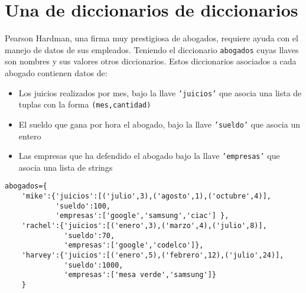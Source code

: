 \section{Una de diccionarios de diccionarios}

Pearson Hardman, una firma muy prestigiosa de abogados, requiere ayuda con el manejo de datos de sus empleados. Teniendo el diccionario \texttt{abogados} cuyas llaves son nombres y sus valores otros diccionarios. Estos diccionarios asociados a cada abogado contienen datos de:
\begin{itemize}
    \item Los juicios realizados por mes, bajo la llave \texttt{'juicios'} que asocia una lista de tuplas con la forma \texttt{(mes,cantidad)}
    \item El sueldo que gana por hora el abogado, bajo la llave \texttt{'sueldo'} que asocia un entero
    \item Las empresas que ha defendido el abogado bajo la llave \texttt{'empresas'} que asocia una lista de strings
\end{itemize}

\begin{lstlisting}[style=consola]
abogados={
    'mike':{'juicios':[('julio',3),('agosto',1),('octubre',4)],
            'sueldo':100,
            'empresas':['google','samsung','ciac'] },
    'rachel':{'juicios':[('enero',3),('marzo',4),('julio',8)],
              'sueldo':70,
              'empresas':['google','codelco']},
    'harvey':{'juicios':[('enero',5),('febrero',12),('julio',24)],
              'sueldo':1000,
              'empresas':['mesa verde','samsung']}
    }
\end{lstlisting}

